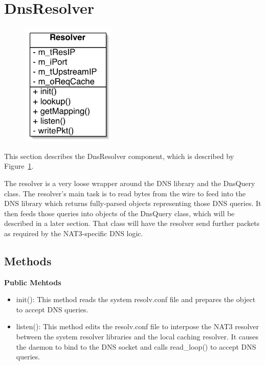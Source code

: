 \section{DnsResolver}\label{sec:resolver}

\begin{figure}
\begin{center}
\includegraphics[width=0.4\textwidth]{figs/resolver}
\end{center}
\caption{}
\label{fig:resolver}
\end{figure}

This section describes the DnsResolver component, which is described by Figure~\ref{fig:resolver}.

The resolver is a very loose wrapper around the DNS library and the DnsQuery class. The resolver's main task is to read bytes from the wire to feed into the DNS library which returns fully-parsed objects representing those DNS queries. It then feeds those queries into objects of the DnsQuery class, which will be described in a later section. That class will have the resolver send further packets as required by the NAT3-specific DNS logic.


\subsection{Methods}

{\bf Public Mehtods}
\begin{itemize}
\item init(): This method reads the system resolv.conf file and prepares the object to accept DNS queries.
\item listen(): This method edits the resolv.conf file to interpose the NAT3 resolver between the system resolver libraries and the local caching resolver. It causes the daemon to bind to the DNS socket and calls read\_loop() to accept DNS queries.
\end{itemize}

